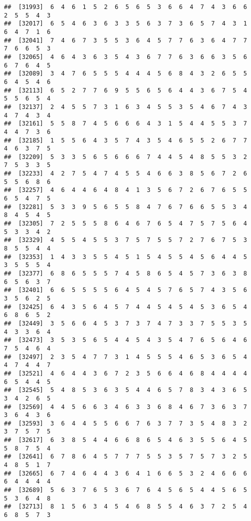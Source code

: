 \documentclass[
]{book}
\begin{document}
\begin{verbatim}
##  [31993]  6  4  6  1  5  2  6  5  6  5  3  6  6  4  7  4  3  6  6  2  5  5  4  3
##  [32017]  6  5  4  6  3  6  3  3  5  6  3  7  3  6  5  7  4  3  1  6  4  7  1  6
##  [32041]  7  4  6  7  3  5  5  3  6  4  5  7  7  6  3  6  4  7  7  7  6  6  5  3
##  [32065]  4  6  4  3  6  3  5  4  3  6  7  7  6  3  6  6  3  5  6  6  7  6  4  5
##  [32089]  3  4  7  6  5  5  5  4  4  4  5  6  8  4  3  2  6  5  5  6  4  5  4  6
##  [32113]  6  5  2  7  7  6  9  5  5  6  5  6  4  4  3  6  7  5  4  5  5  6  5  4
##  [32137]  2  4  5  5  7  3  1  6  3  4  5  5  3  5  4  6  7  4  3  4  7  4  3  4
##  [32161]  5  5  8  7  4  5  6  6  6  4  3  1  5  4  4  5  5  3  7  4  4  7  3  6
##  [32185]  1  5  5  6  4  3  5  7  4  3  5  4  6  5  5  2  6  7  7  4  6  3  7  5
##  [32209]  5  3  3  5  6  5  6  6  6  7  4  4  5  4  8  5  5  3  2  7  5  3  3  5
##  [32233]  4  2  7  5  4  7  4  5  5  4  6  6  3  8  5  6  7  2  6  5  5  6  8  6
##  [32257]  4  6  4  4  6  4  8  4  1  3  5  6  7  2  6  7  6  5  5  6  5  4  7  5
##  [32281]  5  3  3  9  5  6  5  5  8  4  7  6  7  6  6  5  5  3  4  8  4  5  4  5
##  [32305]  7  2  5  5  5  8  6  4  6  7  6  5  4  7  5  7  5  6  4  5  3  3  4  2
##  [32329]  4  5  5  4  5  5  3  7  5  7  5  5  7  2  7  6  7  5  3  8  5  5  4  4
##  [32353]  1  4  3  3  5  5  4  5  1  5  4  5  5  4  5  6  4  4  5  3  5  5  5  4
##  [32377]  6  8  6  5  5  5  7  4  5  8  6  5  4  5  7  3  6  3  8  6  5  6  3  7
##  [32401]  6  6  5  5  5  5  6  4  5  4  5  7  6  5  7  4  3  5  6  3  5  6  2  5
##  [32425]  6  4  3  5  6  4  5  7  4  4  5  4  5  4  5  3  6  5  4  6  8  6  5  2
##  [32449]  3  5  6  6  4  5  3  7  3  7  4  7  3  3  7  5  5  3  5  4  3  3  6  4
##  [32473]  3  5  3  5  6  5  4  4  5  4  3  5  4  7  6  5  6  4  6  7  5  4  6  4
##  [32497]  2  3  5  4  7  7  3  1  4  5  5  5  4  6  5  3  6  5  4  4  7  4  4  7
##  [32521]  4  6  4  4  3  6  7  2  3  5  6  6  4  6  8  4  4  4  4  6  5  4  4  5
##  [32545]  5  4  8  5  3  6  3  5  4  4  6  5  7  8  3  4  3  6  5  3  4  2  6  5
##  [32569]  4  4  5  6  6  3  4  6  3  3  6  8  4  6  7  3  6  3  7  3  6  4  3  6
##  [32593]  3  6  4  4  5  5  6  6  7  6  3  7  7  3  5  4  8  3  2  3  7  5  7  5
##  [32617]  6  3  8  5  4  4  6  6  8  6  5  4  6  3  5  5  6  4  5  5  8  7  5  4
##  [32641]  6  7  8  6  4  5  7  7  7  5  5  3  5  7  5  7  3  2  5  4  8  5  1  7
##  [32665]  6  7  4  6  4  4  3  6  4  1  6  6  5  3  2  4  6  6  6  6  4  4  4  4
##  [32689]  5  6  3  7  6  5  3  6  7  6  4  5  6  5  4  4  5  6  5  5  3  6  4  8
##  [32713]  8  1  5  6  3  4  5  4  6  8  5  5  4  6  3  7  2  5  4  6  8  5  7  3

\end{verbatim}
\end{document}
